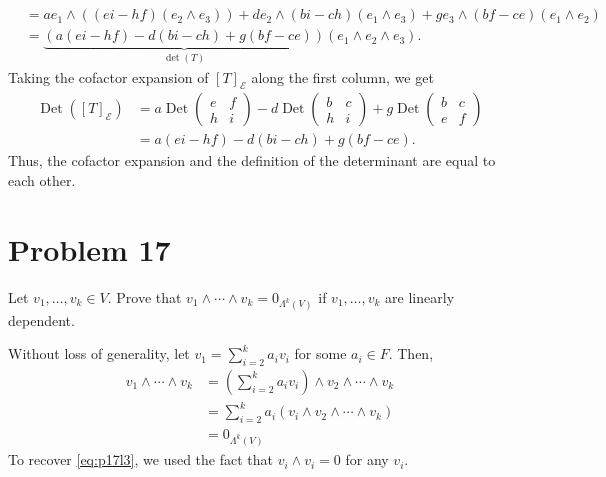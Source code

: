 \documentclass[12pt]{mypackage}
\begin{document}
\begin{solution}
{\begin{align*}
                                                                  \\
                                                                  &= ae_1\wedge \left(\left(ei-hf\right)\left(e_2\wedge e_3\right)\right) + de_2\wedge \left(bi-ch\right)\left(e_1\wedge e_3\right) + ge_3\wedge \left(bf-ce\right)\left(e_1\wedge e_2\right)\\
                                                                  &= \underbrace{\left(a\left(ei-hf\right) - d\left(bi-ch\right) + g\left(bf-ce\right)\right)}_{\det(T)}\left(e_1\wedge e_2\wedge e_3\right).
  \end{align*}
  }
  Taking the cofactor expansion of $\left[T\right]_{\mathcal{E}}$ along the first column, we get
  \begin{align*}
    \operatorname{Det}\left(\left[T\right]_{\mathcal{E}}\right) &= a \operatorname{Det} \begin{pmatrix}e & f \\ h & i\end{pmatrix} - d\operatorname{Det} \begin{pmatrix}b & c \\ h & i\end{pmatrix} + g\operatorname{Det} \begin{pmatrix}b & c \\ e & f\end{pmatrix}\\
                                                                &= a\left(ei-hf\right) - d\left(bi-ch\right) + g\left(bf-ce\right).
  \end{align*}
  Thus, the cofactor expansion and the definition of the determinant are equal to each other.
\end{solution}
\section{Problem 17}%
\begin{problem}
  Let $v_1,\dots,v_k\in V$. Prove that $v_1\wedge\cdots\wedge v_k = 0_{\Lambda^{k}\left(V\right)}$ if $v_1,\dots,v_k$ are linearly dependent.
\end{problem}
\begin{solution}
  Without loss of generality, let $v_1 = \sum_{i=2}^{k}a_iv_i$ for some $a_i\in F$. Then,
  \begin{align*}
    v_1\wedge\cdots\wedge v_k &= \left(\sum_{i=2}^{k}a_{i}v_{i}\right)\wedge v_2\wedge\cdots\wedge v_k\\
                              &= \sum_{i=2}^{k}a_i\left(v_i\wedge v_2\wedge \cdots \wedge v_k\right)\\
                              &= 0_{\Lambda^{k}\left(V\right)}\label{eq:p17l3}\tag*{(\textasteriskcentered)}
  \end{align*}
  To recover \ref{eq:p17l3}, we used the fact that $v_i\wedge v_i = 0$ for any $v_i$.
\end{solution}
\end{document}
